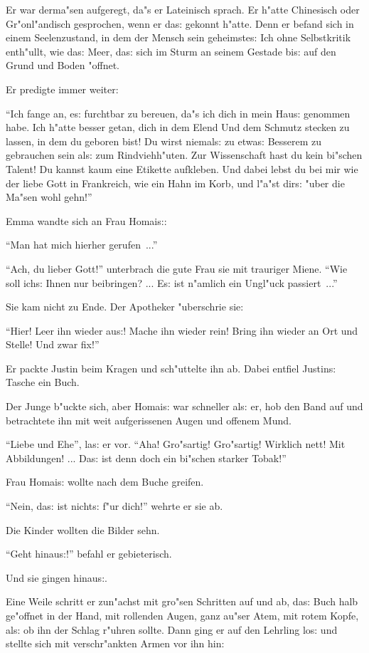 \documentclass[oneside,12pt]{book}
\newcommand{\s}{s:}%
\begin{document}
Er war derma"sen aufgeregt, da"s er Lateinisch sprach. Er h"atte
Chinesisch oder Gr"onl"andisch gesprochen, wenn er da{\s} gekonnt
h"atte. Denn er befand sich in einem Seelenzustand, in dem der
Mensch sein geheimste{\s} Ich ohne Selbstkritik enth"ullt, wie
da{\s} Meer, da{\s} sich im Sturm an seinem Gestade bi{\s} auf den
Grund und Boden "offnet.

Er predigte immer weiter:

"`Ich fange an, e{\s} furchtbar zu bereuen, da"s ich dich in mein
Hau{\s} genommen habe. Ich h"atte besser getan, dich in dem Elend
Und dem Schmutz stecken zu lassen, in dem du geboren bist! Du
wirst niemal{\s} zu etwa{\s} Besserem zu gebrauchen sein al{\s}
zum Rindviehh"uten. Zur Wissenschaft hast du kein bi"schen Talent!
Du kannst kaum eine Etikette aufkleben. Und dabei lebst du bei mir
wie der liebe Gott in Frankreich, wie ein Hahn im Korb, und l"a"st
dir{\s} "uber die Ma"sen wohl gehn!"'

Emma wandte sich an Frau Homai{\s}:

"`Man hat mich hierher gerufen~..."'

"`Ach, du lieber Gott!"' unterbrach die gute Frau sie mit
trauriger Miene. "`Wie soll ich{\s} Ihnen nur beibringen? ...
E{\s} ist n"amlich ein Ungl"uck passiert~..."'

Sie kam nicht zu Ende. Der Apotheker "uberschrie sie:

"`Hier! Leer ihn wieder au{\s}! Mache ihn wieder rein! Bring ihn
wieder an Ort und Stelle! Und zwar fix!"'

Er packte Justin beim Kragen und sch"uttelte ihn ab. Dabei entfiel
Justin{\s} Tasche ein Buch.

Der Junge b"uckte sich, aber Homai{\s} war schneller al{\s} er,
hob den Band auf und betrachtete ihn mit weit aufgerissenen Augen
und offenem Mund.

"`Liebe und Ehe"', la{\s} er vor. "`Aha! Gro"sartig! Gro"sartig!
Wirklich nett! Mit Abbildungen! ... Da{\s} ist denn doch ein
bi"schen starker Tobak!"'

Frau Homai{\s} wollte nach dem Buche greifen.

"`Nein, da{\s} ist nicht{\s} f"ur dich!"' wehrte er sie ab.

Die Kinder wollten die Bilder sehn.

"`Geht hinau{\s}!"' befahl er gebieterisch.

Und sie gingen hinau{\s}.

Eine Weile schritt er zun"achst mit gro"sen Schritten auf und ab,
da{\s} Buch halb ge"offnet in der Hand, mit rollenden Augen, ganz
au"ser Atem, mit rotem Kopfe, al{\s} ob ihn der Schlag r"uhren
sollte. Dann ging er auf den Lehrling lo{\s} und stellte sich mit
verschr"ankten Armen vor ihn hin:
\end{document}
